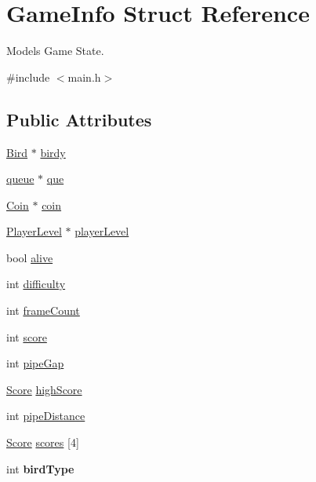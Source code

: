 \hypertarget{struct_game_info}{}\section{Game\+Info Struct Reference}
\label{struct_game_info}


Models Game State.  




{\ttfamily \#include $<$main.\+h$>$}

\subsection*{Public Attributes}
\begin{DoxyCompactItemize}
\item 
\hyperlink{struct_bird}{Bird} $\ast$ \hyperlink{struct_game_info_aee4a8447023b7f3f3ceb9588cd84c7ce}{birdy}
\item 
\hyperlink{structqueue}{queue} $\ast$ \hyperlink{struct_game_info_ae921d4765b1a89b5fcf7ca5a5462bfbf}{que}
\item 
\hyperlink{struct_coin}{Coin} $\ast$ \hyperlink{struct_game_info_a7aa65ed4a2ab803f3cad3a2eb1e0947b}{coin}
\item 
\hyperlink{struct_player_level}{Player\+Level} $\ast$ \hyperlink{struct_game_info_a7c1f3db004a89ba5384af9a54abd1f46}{player\+Level}
\item 
bool \hyperlink{struct_game_info_a47a0b9a98cef651d98214b126d6ed7ec}{alive}
\item 
int \hyperlink{struct_game_info_ae502ef89edb1039e4bd2e703f8d407b4}{difficulty}
\item 
int \hyperlink{struct_game_info_afd418f5a5bdde1773c8ba201340cd71c}{frame\+Count}
\item 
int \hyperlink{struct_game_info_ac46b9867fe4baf039bb1ebb132f1168f}{score}
\item 
int \hyperlink{struct_game_info_a35dd3f7cc8f29de98575321a8c710d9e}{pipe\+Gap}
\item 
\hyperlink{struct_score}{Score} \hyperlink{struct_game_info_aad280f82718715eb41462a5d3f290594}{high\+Score}
\item 
int \hyperlink{struct_game_info_a948bb38de6f9b40bf6b44c5b56f80a75}{pipe\+Distance}
\item 
\hyperlink{struct_score}{Score} \hyperlink{struct_game_info_a5bd798bc489729fd6fd44ba615cefb7c}{scores} \mbox{[}4\mbox{]}
\item 
\mbox{\label{struct_game_info_ae4666e5199b67e492b3617e6fd41d459}} 
int {\bfseries bird\+Type}
\end{DoxyCompactItemize}


